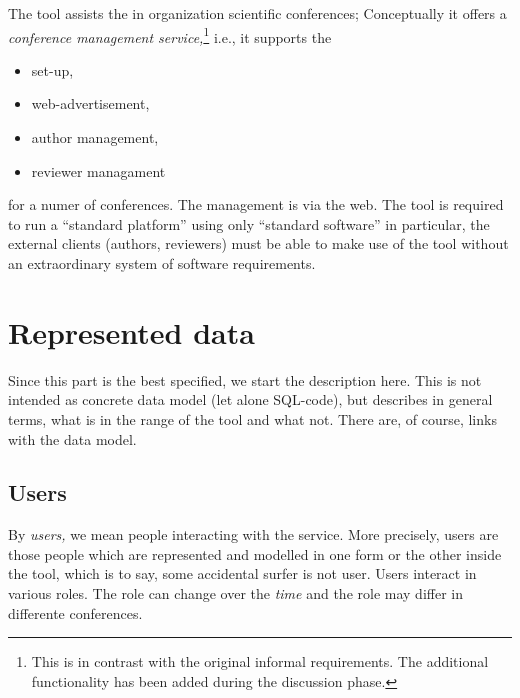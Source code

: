 The tool assists the in organization scientific conferences; Conceptually
it offers a \emph{conference management service,}\footnote{This is in
  contrast with the original informal requirements. The additional
  functionality has been added during the discussion phase.} i.e., it
supports the 
\begin{itemize}
\item set-up,
\item web-advertisement,
\item author management,
\item reviewer managament
\end{itemize}
for a numer of conferences. The management is via the web. The tool is
required to run a ``standard platform'' using only ``standard software'' in
particular, the external clients (authors, reviewers) must be able to make
use of the tool without an extraordinary system of software requirements.


\section{Represented data}

Since this part is the best specified, we start the description here. This
is not intended as concrete data model (let alone SQL-code), but describes
in general terms, what is in the range of the tool and what not. There are,
of course, links with the data model.





\subsection{Users}
\label{sec:users}


By \emph{users,} we mean people interacting with the service. More
precisely, users are those people which are represented and modelled in one
form or the other inside the tool, which is to say, some accidental surfer
is not user. Users interact in various roles. The role can change over the
\emph{time} and the role may differ in differente conferences.

